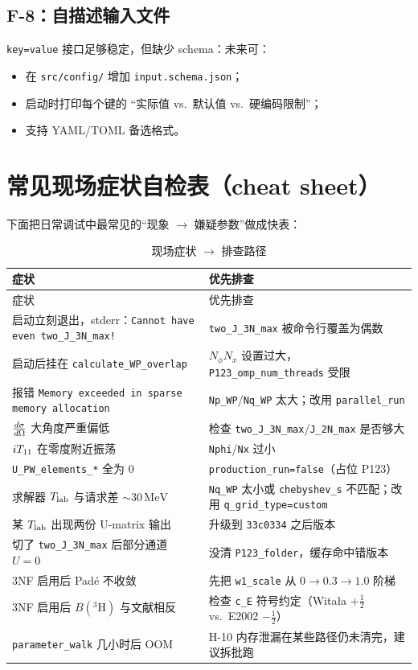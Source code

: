 \subsection{F-8：自描述输入文件}

\texttt{key=value} 接口足够稳定，但缺少 schema：未来可：
\begin{itemize}
  \item 在 \texttt{src/config/} 增加 \texttt{input.schema.json}；
  \item 启动时打印每个键的 “实际值 vs.~默认值 vs.~硬编码限制”；
  \item 支持 YAML/TOML 备选格式。
\end{itemize}

\section{常见现场症状自检表（cheat sheet）}
\label{sec:appF_cheat_sheet}

下面把日常调试中最常见的“现象 \(\to\) 嫌疑参数”做成快表：

\begin{longtable}{p{6.5cm}p{8cm}}
\caption{现场症状 \(\to\) 排查路径}
\label{tab:appF_cheatsheet}\\
\toprule
症状 & 优先排查 \\
\midrule
\endfirsthead
\toprule
症状 & 优先排查 \\
\midrule
\endhead
启动立刻退出，stderr：\texttt{Cannot have even two\_J\_3N\_max!} & \texttt{two\_J\_3N\_max} 被命令行覆盖为偶数 \\
启动后挂在 \texttt{calculate\_WP\_overlap} & \(N_\phi N_x\) 设置过大，\texttt{P123\_omp\_num\_threads} 受限 \\
报错 \texttt{Memory exceeded in sparse memory allocation} & \texttt{Np\_WP}/\texttt{Nq\_WP} 太大；改用 \texttt{parallel\_run} \\
\(\frac{d\sigma}{d\Omega}\) 大角度严重偏低 & 检查 \texttt{two\_J\_3N\_max}/\texttt{J\_2N\_max} 是否够大 \\
\({i T_{11}}\) 在零度附近振荡 & \texttt{Nphi}/\texttt{Nx} 过小 \\
\texttt{U\_PW\_elements\_*} 全为 \(0\) & \texttt{production\_run=false}（占位 P123） \\
求解器 \({T_{\text{lab}}}\) 与请求差 \(\sim 30\,\mathrm{MeV}\) & \texttt{Nq\_WP} 太小或 \texttt{chebyshev\_s} 不匹配；改用 \texttt{q\_grid\_type=custom} \\
某 \({T_{\text{lab}}}\) 出现两份 U-matrix 输出 & 升级到 \texttt{33c0334} 之后版本 \\
切了 \texttt{two\_J\_3N\_max} 后部分通道 \(U=0\) & 没清 \texttt{P123\_folder}，缓存命中错版本 \\
3NF 启用后 Padé 不收敛 & 先把 \texttt{w1\_scale} 从 \(0\to 0.3\to 1.0\) 阶梯 \\
3NF 启用后 \(B(^3\!\mathrm{H})\) 与文献相反 & 检查 \texttt{c\_E} 符号约定（Witała \(+\tfrac12\) vs.~E2002 \(-\tfrac12\)） \\
\texttt{parameter\_walk} 几小时后 OOM & H-10 内存泄漏在某些路径仍未清完，建议拆批跑 \\
\bottomrule
\end{longtable}

